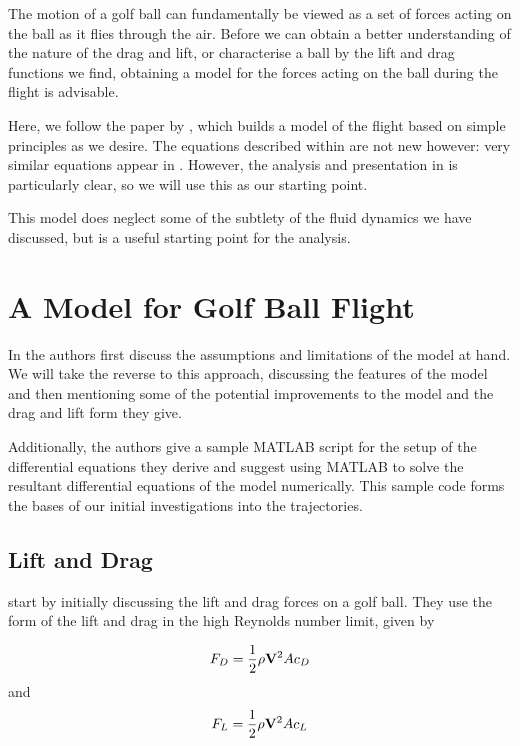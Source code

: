 The motion of a golf ball can fundamentally be viewed as a set of forces acting on the ball as it
flies through the air. Before we can obtain a better understanding of the nature of the drag and lift,
or characterise a ball by the lift and drag functions we find,
obtaining a model for the forces acting on the ball during the flight is advisable. 

Here, we follow the paper by \citet{Robinson2013}, which builds a model of the flight based on simple principles as
we desire. The equations described within \citet{Robinson2013} are not new however: very similar
equations appear in \citet{Bearman1976}. However, the analysis and presentation in \citet{Robinson2013}
is particularly clear, so we will use this as our starting point.

This model does neglect some of the subtlety of the fluid dynamics we have discussed,
but is a useful starting point for the analysis.

\section{A Model for Golf Ball Flight}

In \citet{Robinson2013} the authors first discuss the assumptions and limitations of the model at hand.
We will take the reverse to this approach, discussing the features of the model and then mentioning
some of the potential improvements to the model and the drag and lift form they give.

Additionally, the authors give a sample MATLAB script for the setup of the differential equations they
derive and suggest using MATLAB to solve the resultant differential equations of the model numerically. 
This sample code forms the bases of our initial investigations into the trajectories.

\subsection{Lift and Drag}

\citeauthor*{Robinson2013} start by initially discussing the lift and drag forces on a golf ball.
They use the form of the lift and drag in the high Reynolds number limit, given by

\begin{equation} \nonumber
F_{D} = \frac{1}{2} \rho \mathbf{V}^2 A c_{D}
\end{equation}
and
\begin{equation} \nonumber
F_{L} = \frac{1}{2} \rho \mathbf{V}^2 A c_{L}
\end{equation}

